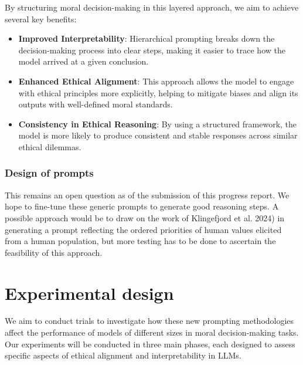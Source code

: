 \documentclass{article}
\begin{document}
By structuring moral decision-making in this layered approach, we aim to achieve several key benefits:
\begin{itemize}
    \item \textbf{Improved Interpretability}: Hierarchical prompting breaks down the decision-making process into clear steps, making it easier to trace how the model arrived at a given conclusion.
    \item \textbf{Enhanced Ethical Alignment}: This approach allows the model to engage with ethical principles more explicitly, helping to mitigate biases and align its outputs with well-defined moral standards.
    \item \textbf{Consistency in Ethical Reasoning}: By using a structured framework, the model is more likely to produce consistent and stable responses across similar ethical dilemmas.
\end{itemize}

\subsubsection{Design of prompts}

This remains an open question as of the submission of this progress report. We hope to fine-tune these generic prompts to generate good reasoning steps. A possible approach would be to draw on the work of Klingefjord et al. 2024) \cite{klingefjord2024humanvaluesalignai} in generating a prompt reflecting the ordered priorities of human values elicited from a human population, but more testing has to be done to ascertain the feasibility of this approach.


\section{Experimental design}

We aim to conduct trials to investigate how these new prompting methodologies affect the performance of models of different sizes in moral decision-making tasks. Our experiments will be conducted in three main phases, each designed to assess specific aspects of ethical alignment and interpretability in LLMs.
\end{document}
